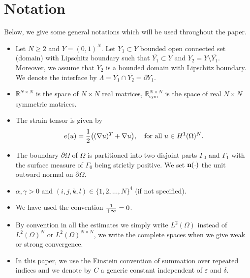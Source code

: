 \documentclass[11pt,a4paper]{article}
\numberwithin{equation}{section}
\def\wo{\overline}
\def\O{\Omega}
\def\d{\delta}
\def\e{\varepsilon}
\def\sy{\text{sym}}
\def\R{{\mathbb{R}}}
\def\R{{\mathbb{R}}}
\def\X{\times }
\def\Gn{{\bf n}}
\begin{document}
\section{Notation}\label{N-1}
Below, we give some general notations which will be used throughout the paper.
\begin{itemize}
	\item Let $N\geq 2$ and $Y=(0,1)^N$. Let $Y_1\subset Y$ bounded open connected set (domain) with Lipschitz boundary such that $\wo{Y_1}\subset Y$ and $Y_2= Y\setminus\overline{Y_1}$. Moreover, we assume that $Y_2$ is a bounded domain with Lipschitz boundary. We denote the interface by $\Lambda=\wo{Y_1}\cap \wo{Y_2} =\partial Y_1$. 
	\item  $\R^{N\X N}$ is the space of $N\times N$  real matrices, $\R_\sy^{N\X N}$ is the space of real $N\X N$ symmetric matrices.
	\item The strain tensor is given by
	$$e(u)={1\over 2}\big((\nabla u)^T+\nabla u\big),\quad \text{for all $u\in H^1(\O)^N$}.$$
	\item The boundary $\partial\O$ of $\O$ is partitioned into two disjoint parts $\Gamma_0$ and $\Gamma_1$ with the surface measure of $\Gamma_0$ being strictly positive. We set $\Gn(\cdot)$ the unit outward normal on $\partial\O$.
	\item $\alpha,\gamma > 0$ and $(i,j,k,l)\in \{1,2,\ldots, N\}^4$ (if not specified).
	\item We have used the convention ${1\over +\infty}=0$.
	\item By convention in all the estimates we simply write $L^2(\O)$ instead of $L^2(\O)^N$ or $L^2(\O)^{N\times N}$, we write the complete spaces when we give weak or strong convergence.
	\item In this paper, we use the Einstein convention of summation over repeated indices and we denote by $C$ a generic constant independent of $\e$ and $\d$.
\end{itemize}
\end{document}
